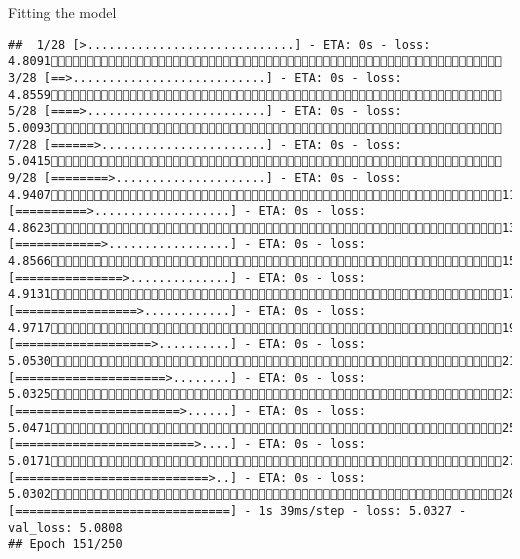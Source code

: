 \documentclass[
  ignorenonframetext,
]{beamer}
\begin{document}
\begin{frame}[fragile]{Fitting the model}
\begin{verbatim}
##  1/28 [>.............................] - ETA: 0s - loss: 4.8091 3/28 [==>...........................] - ETA: 0s - loss: 4.8559 5/28 [====>.........................] - ETA: 0s - loss: 5.0093 7/28 [======>.......................] - ETA: 0s - loss: 5.0415 9/28 [========>.....................] - ETA: 0s - loss: 4.940711/28 [==========>...................] - ETA: 0s - loss: 4.862313/28 [============>.................] - ETA: 0s - loss: 4.856615/28 [===============>..............] - ETA: 0s - loss: 4.913117/28 [=================>............] - ETA: 0s - loss: 4.971719/28 [===================>..........] - ETA: 0s - loss: 5.053021/28 [=====================>........] - ETA: 0s - loss: 5.032523/28 [=======================>......] - ETA: 0s - loss: 5.047125/28 [=========================>....] - ETA: 0s - loss: 5.017127/28 [===========================>..] - ETA: 0s - loss: 5.030228/28 [==============================] - 1s 39ms/step - loss: 5.0327 - val_loss: 5.0808
## Epoch 151/250

\end{verbatim}
\end{frame}
\end{document}
